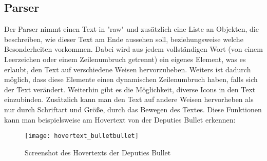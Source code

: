 
\renewcommand{\kapitelautor}{Autor: Felix Zwickelstorfer}
\subsection{Parser}\label{subsec:parser}
\renewcommand{\kapitelautor}{Autor: Felix Zwickelstorfer}

Der Parser nimmt einen Text in "raw" und zusätzlich eine Liste an Objekten, die beschreiben, wie dieser Text am Ende aussehen soll, beziehungsweise welche Besonderheiten vorkommen.
Dabei wird aus jedem vollständigen Wort (von einem Leerzeichen oder einem Zeilenumbruch getrennt) ein eigenes Element, was es erlaubt, den Text auf verschiedene Weisen hervorzuheben.
Weiters ist dadurch möglich, dass diese Elemente einen dynamischen Zeilenumbruch haben, falls sich der Text verändert.
Weiterhin gibt es die Möglichkeit, diverse Icons in den Text einzubinden.
Zusätzlich kann man den Text auf andere Weisen hervorheben als nur durch Schriftart und Größe, \zB durch das Bewegen des Textes.
Diese Funktionen kann man beispielsweise am Hovertext von der Deputies Bullet erkennen:
\begin{figure}[H]
    \centering
    \texttt{[image: hovertext\_bulletbullet]}
    \caption{Screenshot des Hovertexts der Deputies Bullet}
\end{figure}